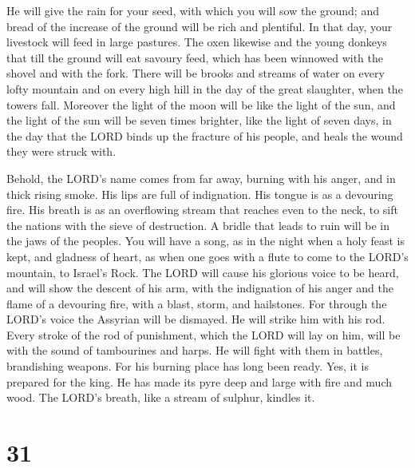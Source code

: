  He will give the rain for your seed, with which you will
sow the ground; and bread of the increase of the ground will be rich and
plentiful. In that day, your livestock will feed in large pastures.
 The oxen likewise and the young donkeys that till the
ground will eat savoury feed, which has been winnowed with the shovel
and with the fork.  There will be brooks and streams of
water on every lofty mountain and on every high hill in the day of the
great slaughter, when the towers fall.  Moreover the light
of the moon will be like the light of the sun, and the light of the sun
will be seven times brighter, like the light of seven days, in the day
that the LORD binds up the fracture of his people, and heals the wound
they were struck with.

 Behold, the LORD's name comes from far away, burning with
his anger, and in thick rising smoke. His lips are full of indignation.
His tongue is as a devouring fire.  His breath is as an
overflowing stream that reaches even to the neck, to sift the nations
with the sieve of destruction. A bridle that leads to ruin will be in
the jaws of the peoples.  You will have a song, as in the
night when a holy feast is kept, and gladness of heart, as when one goes
with a flute to come to the LORD's mountain, to Israel's Rock.
 The LORD will cause his glorious voice to be heard, and
will show the descent of his arm, with the indignation of his anger and
the flame of a devouring fire, with a blast, storm, and hailstones.
 For through the LORD's voice the Assyrian will be
dismayed. He will strike him with his rod.  Every stroke of
the rod of punishment, which the LORD will lay on him, will be with the
sound of tambourines and harps. He will fight with them in battles,
brandishing weapons.  For his burning place has long been
ready. Yes, it is prepared for the king. He has made its pyre deep and
large with fire and much wood. The LORD's breath, like a stream of
sulphur, kindles it.

\hypertarget{section-30}{%
\section{31}\label{section-30}}

